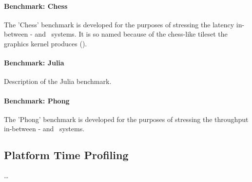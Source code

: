 \paragraph{Benchmark: Chess}
\label{par:methodology_experimentmethodology_benchmarkchess}
The 'Chess' benchmark is developed for the purposes of stressing the latency in-between \dvttermtarget - and \dvttermhost\ systems.
It is so named because of the chess-like tileset the graphics kernel produces ().



\paragraph{Benchmark: Julia}
\label{par:methodology_experimentmethodology_benchmarkjulia}
Description of the Julia benchmark.

\paragraph{Benchmark: Phong}
\label{par:methodology_experimentmethodology_benchmarkphong}
The 'Phong' benchmark is developed for the purposes of stressing the throughput in-between \dvttermtarget - and \dvttermhost\ systems.

\subsection{Platform Time Profiling}
\label{sec:methodology_experimentmethodology_platoformtimeprofiling}
\ldots




